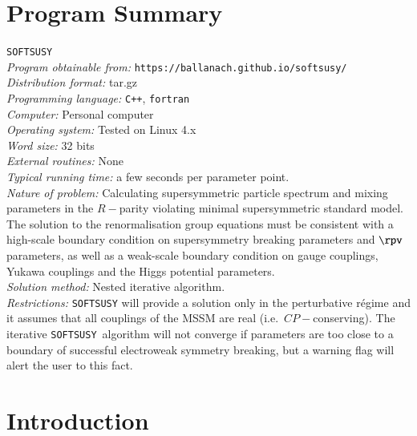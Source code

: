 \documentclass[final,3p,times,pdflatex]{elsarticle}
\def\SOFTSUSY{{\tt SOFTSUSY}}
\begin{document}
\section{Program Summary}
 \SOFTSUSY{}\\
{\em Program obtainable
  from:} {\tt https://ballanach.github.io/softsusy/}\\
{\em Distribution format:}\/ tar.gz\\
{\em Programming language:} {\tt C++}, {\tt fortran}\\
{\em Computer:}\/ Personal computer\\
{\em Operating system:}\/ Tested on Linux 4.x\\
{\em Word size:}\/ 32 bits\\
{\em External routines:}\/ None\\
{\em Typical running time:}\/ a few seconds per parameter point.\\
{\em Nature of problem:}\/ Calculating supersymmetric particle spectrum and
mixing parameters in the $R-$parity violating minimal supersymmetric standard
model. The solution to the renormalisation group equations must be consistent
with a high-scale boundary condition on supersymmetry breaking parameters and
$\rpv$ parameters, as well as a weak-scale boundary condition on gauge
couplings, Yukawa couplings and the Higgs potential parameters.\\
{\em Solution method:}\/ Nested iterative algorithm. \\
{\em Restrictions:} {\SOFTSUSY} will provide a solution only in the
perturbative r\'{e}gime and it
assumes that all couplings of the MSSM are real
(i.e.\ $CP-$conserving). The iterative \SOFTSUSY~algorithm will not 
converge if parameters are too close to a boundary of successful electroweak
symmetry breaking, but a warning flag will alert the user to this fact.

\newpage

\section{Introduction}
\end{document}
